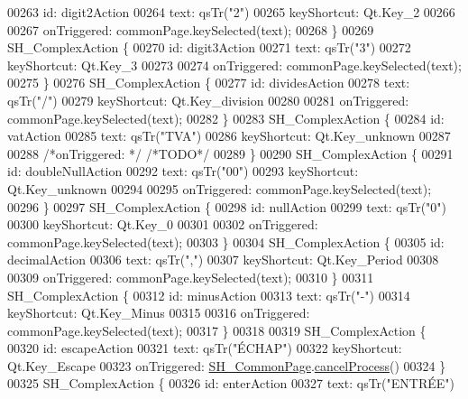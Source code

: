 \begin{DoxyCode}
00263         \textcolor{keywordtype}{id}: digit2Action
00264         text: qsTr(\textcolor{stringliteral}{"2"})
00265         keyShortcut: Qt.Key\_2
00266 
00267         onTriggered: commonPage.keySelected(text);
00268     \}
00269     SH\_ComplexAction \{
00270         \textcolor{keywordtype}{id}: digit3Action
00271         text: qsTr(\textcolor{stringliteral}{"3"})
00272         keyShortcut: Qt.Key\_3
00273 
00274         onTriggered: commonPage.keySelected(text);
00275     \}
00276     SH\_ComplexAction \{
00277         \textcolor{keywordtype}{id}: dividesAction
00278         text: qsTr(\textcolor{stringliteral}{"/"})
00279         keyShortcut: Qt.Key\_division
00280 
00281         onTriggered: commonPage.keySelected(text);
00282     \}
00283     SH\_ComplexAction \{
00284         \textcolor{keywordtype}{id}: vatAction
00285         text: qsTr(\textcolor{stringliteral}{"TVA"})
00286         keyShortcut: Qt.Key\_unknown
00287 
00288         \textcolor{comment}{/*onTriggered: */} \textcolor{comment}{/*TODO*/}
00289     \}
00290     SH\_ComplexAction \{
00291         \textcolor{keywordtype}{id}: doubleNullAction
00292         text: qsTr(\textcolor{stringliteral}{"00"})
00293         keyShortcut: Qt.Key\_unknown
00294 
00295         onTriggered: commonPage.keySelected(text);
00296     \}
00297     SH\_ComplexAction \{
00298         \textcolor{keywordtype}{id}: nullAction
00299         text: qsTr(\textcolor{stringliteral}{"0"})
00300         keyShortcut: Qt.Key\_0
00301 
00302         onTriggered: commonPage.keySelected(text);
00303     \}
00304     SH\_ComplexAction \{
00305         \textcolor{keywordtype}{id}: decimalAction
00306         text: qsTr(\textcolor{stringliteral}{","})
00307         keyShortcut: Qt.Key\_Period
00308 
00309         onTriggered: commonPage.keySelected(text);
00310     \}
00311     SH\_ComplexAction \{
00312         \textcolor{keywordtype}{id}: minusAction
00313         text: qsTr(\textcolor{stringliteral}{"-"})
00314         keyShortcut: Qt.Key\_Minus
00315 
00316         onTriggered: commonPage.keySelected(text);
00317     \}
00318 
00319     SH\_ComplexAction \{
00320         \textcolor{keywordtype}{id}: escapeAction
00321         text: qsTr(\textcolor{stringliteral}{"ÉCHAP"})
00322         keyShortcut: Qt.Key\_Escape
00323         onTriggered: \hyperlink{classSH__CommonPage}{SH\_CommonPage}.\hyperlink{classSH__CommonPage_a500427619a33ea991ed173fa0ac3b446}{cancelProcess}()
00324     \}
00325     SH\_ComplexAction \{
00326         \textcolor{keywordtype}{id}: enterAction
00327         text: qsTr(\textcolor{stringliteral}{"ENTRÉE"})

\end{DoxyCode}
